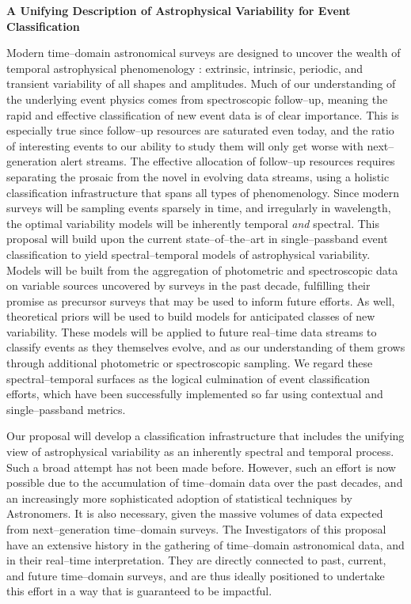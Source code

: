 \centerline{\bf A Unifying Description of Astrophysical Variability for Event
Classification}

Modern time--domain astronomical surveys are designed to uncover the wealth of
temporal astrophysical phenomenology : extrinsic, intrinsic, periodic, and
transient variability of all shapes and amplitudes.  Much of our understanding
of the underlying event physics comes from spectroscopic follow--up, meaning the
rapid and effective classification of new event data is of clear importance. 
This is especially true since follow--up resources are saturated even today, and
the ratio of interesting events to our ability to study them will only get worse
with next--generation alert streams. The effective allocation of follow--up
resources requires separating the prosaic from the novel in evolving data
streams, using a holistic classification infrastructure that spans all types of
phenomenology. Since modern surveys will be sampling events sparsely in time,
and irregularly in wavelength, the optimal variability models will be inherently
temporal {\it and} spectral.  This proposal will build upon the current
state--of--the--art in single--passband event classification to yield
spectral--temporal models of astrophysical variability.  Models will be built
from the aggregation of photometric and spectroscopic data on variable sources
uncovered by surveys in the past decade, fulfilling their promise as precursor
surveys that may be used to inform future efforts.  As well, theoretical priors
will be used to build models for anticipated classes of new variability.  These
models will be applied to future real--time data streams to classify events as
they themselves evolve, and as our understanding of them grows through
additional photometric or spectroscopic sampling.  We regard these
spectral--temporal surfaces as the logical culmination of event classification
efforts, which have been successfully implemented so far using contextual and
single--passband metrics.

\bigskip \centerline{}

Our proposal will develop a classification infrastructure that includes the
unifying view of astrophysical variability as an inherently spectral and
temporal process.  Such a broad attempt has not been made before. However, such
an effort is now possible due to the accumulation of time--domain data over the
past decades, and an increasingly more sophisticated adoption of statistical
techniques by Astronomers. It is also necessary, given the massive volumes of
data expected from next--generation time--domain surveys. The Investigators of
this proposal have an extensive history in the gathering of time--domain
astronomical data, and in their real--time interpretation.  They are directly
connected to past, current, and future time--domain surveys, and are thus
ideally positioned to undertake this effort in a way that is guaranteed to be
impactful.

